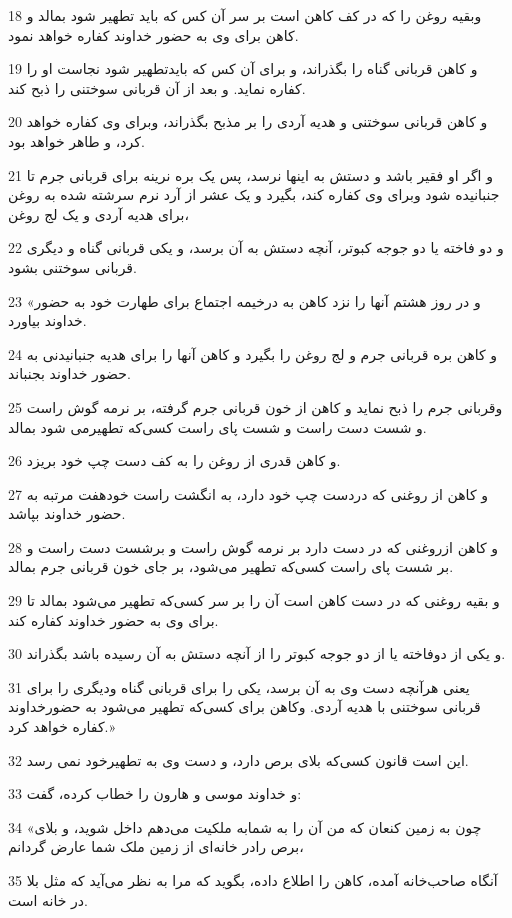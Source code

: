 \par 18 وبقیه روغن را که در کف کاهن است بر سر آن کس که باید تطهیر شود بمالد و کاهن برای وی به حضور خداوند کفاره خواهد نمود.
\par 19 و کاهن قربانی گناه را بگذراند، و برای آن کس که بایدتطهیر شود نجاست او را کفاره نماید. و بعد از آن قربانی سوختنی را ذبح کند.
\par 20 و کاهن قربانی سوختنی و هدیه آردی را بر مذبح بگذراند، وبرای وی کفاره خواهد کرد، و طاهر خواهد بود.
\par 21 و اگر او فقیر باشد و دستش به اینها نرسد، پس یک بره نرینه برای قربانی جرم تا جنبانیده شود وبرای وی کفاره کند، بگیرد و یک عشر از آرد نرم سرشته شده به روغن برای هدیه آردی و یک لج روغن،
\par 22 و دو فاخته یا دو جوجه کبوتر، آنچه دستش به آن برسد، و یکی قربانی گناه و دیگری قربانی سوختنی بشود.
\par 23 «و در روز هشتم آنها را نزد کاهن به درخیمه اجتماع برای طهارت خود به حضور خداوند بیاورد.
\par 24 و کاهن بره قربانی جرم و لج روغن را بگیرد و کاهن آنها را برای هدیه جنبانیدنی به حضور خداوند بجنباند.
\par 25 وقربانی جرم را ذبح نماید و کاهن از خون قربانی جرم گرفته، بر نرمه گوش راست و شست دست راست و شست پای راست کسی‌که تطهیرمی شود بمالد.
\par 26 و کاهن قدری از روغن را به کف دست چپ خود بریزد.
\par 27 و کاهن از روغنی که دردست چپ خود دارد، به انگشت راست خودهفت مرتبه به حضور خداوند بپاشد.
\par 28 و کاهن ازروغنی که در دست دارد بر نرمه گوش راست و برشست دست راست و بر شست پای راست کسی‌که تطهیر می‌شود، بر جای خون قربانی جرم بمالد.
\par 29 و بقیه روغنی که در دست کاهن است آن را بر سر کسی‌که تطهیر می‌شود بمالد تا برای وی به حضور خداوند کفاره کند.
\par 30 و یکی از دوفاخته یا از دو جوجه کبوتر را از آنچه دستش به آن رسیده باشد بگذراند.
\par 31 یعنی هر‌آنچه دست وی به آن برسد، یکی را برای قربانی گناه ودیگری را برای قربانی سوختنی با هدیه آردی. وکاهن برای کسی‌که تطهیر می‌شود به حضورخداوند کفاره خواهد کرد.»
\par 32 این است قانون کسی‌که بلای برص دارد، و دست وی به تطهیرخود نمی رسد.
\par 33 و خداوند موسی و هارون را خطاب کرده، گفت:
\par 34 «چون به زمین کنعان که من آن را به شمابه ملکیت می‌دهم داخل شوید، و بلای برص رادر خانه‌ای از زمین ملک شما عارض گردانم،
\par 35 آنگاه صاحب‌خانه آمده، کاهن را اطلاع داده، بگوید که مرا به نظر می‌آید که مثل بلا در خانه است.
